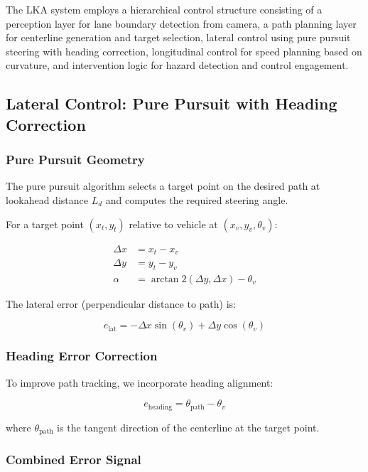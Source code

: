 \documentclass[11pt,a4paper]{article}
\begin{document}
The LKA system employs a hierarchical control structure consisting of a perception layer for lane boundary detection from camera, a path planning layer for centerline generation and target selection, lateral control using pure pursuit steering with heading correction, longitudinal control for speed planning based on curvature, and intervention logic for hazard detection and control engagement.

\subsection{Lateral Control: Pure Pursuit with Heading Correction}

\subsubsection{Pure Pursuit Geometry}

The pure pursuit algorithm selects a target point on the desired path at lookahead distance $L_d$ and computes the required steering angle.

For a target point $(x_t, y_t)$ relative to vehicle at $(x_v, y_v, \theta_v)$:

\begin{align}
\Delta x &= x_t - x_v \\
\Delta y &= y_t - y_v \\
\alpha &= \arctan2(\Delta y, \Delta x) - \theta_v
\end{align}

The lateral error (perpendicular distance to path) is:

\begin{equation}
e_{\text{lat}} = -\Delta x \sin(\theta_v) + \Delta y \cos(\theta_v)
\end{equation}

\subsubsection{Heading Error Correction}

To improve path tracking, we incorporate heading alignment:

\begin{equation}
e_{\text{heading}} = \theta_{\text{path}} - \theta_v
\end{equation}

where $\theta_{\text{path}}$ is the tangent direction of the centerline at the target point.

\subsubsection{Combined Error Signal}
\end{document}
